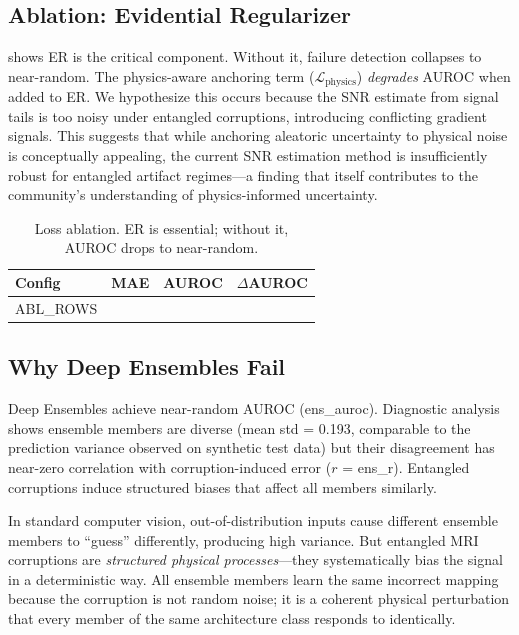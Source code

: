\documentclass[11pt,a4paper]{article}
\begin{document}
\subsection{Ablation: Evidential Regularizer}

 shows ER is the critical component. Without it, failure detection collapses to near-random. The physics-aware anchoring term ($\mathcal{L}_{\text{physics}}$) \emph{degrades} AUROC when added to ER. We hypothesize this occurs because the SNR estimate from signal tails is too noisy under entangled corruptions, introducing conflicting gradient signals. This suggests that while anchoring aleatoric uncertainty to physical noise is conceptually appealing, the current SNR estimation method is insufficiently robust for entangled artifact regimes---a finding that itself contributes to the community's understanding of physics-informed uncertainty.

\begin{table}[H]
  \centering
  \caption{Loss ablation. ER is essential; without it, AUROC drops to near-random.}
  \label{tab:ablation}
  \begin{tabular}{@{}lccc@{}}
    \toprule
    \textbf{Config} & \textbf{MAE} & \textbf{AUROC} & \textbf{$\Delta$AUROC} \\
    \midrule
{{ABL_ROWS}}    \bottomrule
  \end{tabular}
\end{table}

\subsection{Why Deep Ensembles Fail}

Deep Ensembles achieve near-random AUROC ({{ens_auroc}}). Diagnostic analysis shows ensemble members are diverse (mean std = 0.193, comparable to the prediction variance observed on synthetic test data) but their disagreement has near-zero correlation with corruption-induced error ($r$ = {{ens_r}}). Entangled corruptions induce structured biases that affect all members similarly.

\begin{intuition}
In standard computer vision, out-of-distribution inputs cause different ensemble members to ``guess'' differently, producing high variance. But entangled MRI corruptions are \emph{structured physical processes}---they systematically bias the signal in a deterministic way. All ensemble members learn the same incorrect mapping because the corruption is not random noise; it is a coherent physical perturbation that every member of the same architecture class responds to identically.
\end{intuition}
\end{document}
